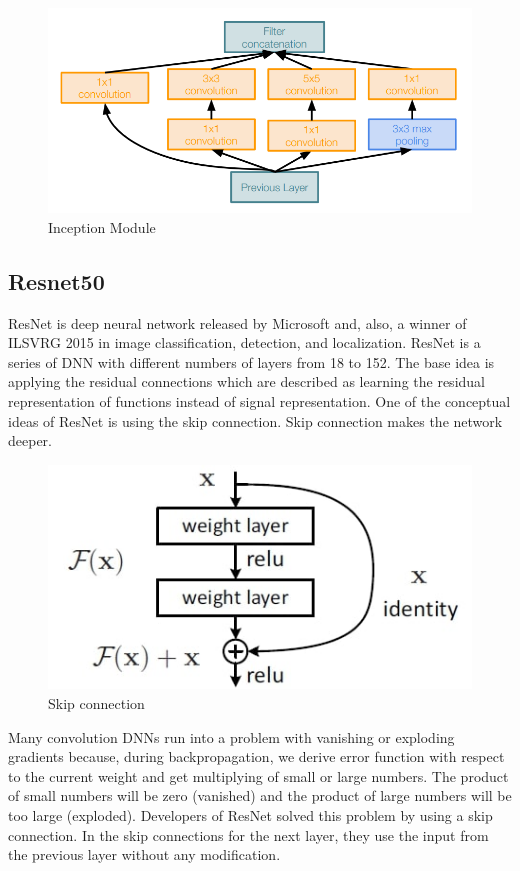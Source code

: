 \documentclass[titlepage]{report}
\begin{document}
\begin{figure}[h!]
    \centering
    \includegraphics[scale=0.4]{googlenet}
    \caption{Inception Module}
\end{figure}

\subsection{Resnet50}
ResNet is deep neural network released by Microsoft and, also, a winner of ILSVRG 2015 in image classification, detection, and localization. ResNet is a series of DNN with different numbers of layers from 18 to 152. The base idea is applying the residual connections which are described as learning the residual representation of functions instead of signal representation. One of the conceptual ideas of ResNet is using the skip connection. Skip connection makes the network deeper.  
\begin{figure}[h!]
    \centering
    \includegraphics[scale=0.4]{resnet_1}
    \caption{Skip connection}
\end{figure}

Many convolution DNNs run into a problem with vanishing or exploding gradients because, during backpropagation, we derive error function with respect to the current weight and get multiplying of small or large numbers. The product of small numbers will be zero (vanished) and the product of large numbers will be too large (exploded). Developers of ResNet solved this problem by using a skip connection. In the skip connections for the next layer, they use the input from the previous layer without any modification. 
\end{document}
